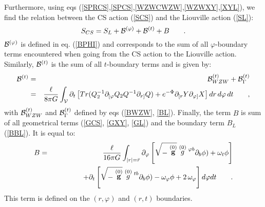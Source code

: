 \documentclass[a4paper,10pt]{article}
\begin{document}
Furthermore, using eqs 
(\ref{SPRCS},\ref{SPCS},\ref{WZWCWZW},\ref{WZWXY},\ref{XYL}), 
we find the relation between the CS action (\ref{SCS}) and the
Liouville action (\ref{SL}):
\begin{equation}
\label{SCSSL}
S_{CS}=S_L+ {\cal B}^{(\varphi)} + {\cal B}^{(t)} + B 
\qquad .  
\end{equation}
${\cal B}^{(\varphi)}$ is defined
in eq. (\ref{BPHI}) and corresponds to the sum of all 
$\varphi$-boundary terms encountered when going from the CS action to the
Liouville action. Similarly, ${\cal B}^{(t)}$ is the sum of all
$t$-boundary terms and is given by:
\begin{eqnarray}
{\cal B}^{(t)} &=& {\cal B}^{(t)}_{WZW}+{\cal B}^{(t)}_\Gamma 
 \nonumber \\ 
\label{BT}
&=&
\frac {\ell}  {8 \pi G}
\int_{\cal V} \partial_t
\left [ Tr (Q_2^{-1} \partial_{[\varphi} Q_2 Q^{-1} \partial_{r]} Q )
+ e^{-\Phi} \partial_{[r} Y \partial_{\varphi]} X \right ]
 dr\, d\varphi\, dt 
\qquad ,
\end{eqnarray}
with ${\cal B}^{(t)}_{WZW}$ and ${\cal B}^{(t)}_\Gamma$ defined by eqs 
(\ref{BWZW}, \ref{BL}).
Finally, the term $B$ is sum of all geometrical terms
(\ref{GCS}, \ref{GXY}, \ref{GL}) and the boundary term $B_L$ (\ref{BBL}). 
It is equal to:
\begin{eqnarray}
B &=& 
\frac {\ell} {16 \pi G} \int _{|r|=\bar r}
\partial_\varphi \left [
\sqrt{- \stackrel {(0)} {\bf g}} \stackrel {(0)} g \strut ^{\varphi b}
\partial_b \phi) +
 \omega_t \phi \right ] \nonumber \\
\label{Bdroit}
&& \qquad \qquad 
+ \partial_t \left [
\sqrt{- \stackrel {(0)} {\bf g}} \stackrel {(0)} g \strut ^{tb}
\partial_b \phi) 
- \omega_\varphi \phi  + 2\, \omega_\varphi \right] d\varphi dt \qquad .
\end{eqnarray}
This term is defined on the $(r, \varphi)$ and $(r, t)$ boundaries.
\end{document}
